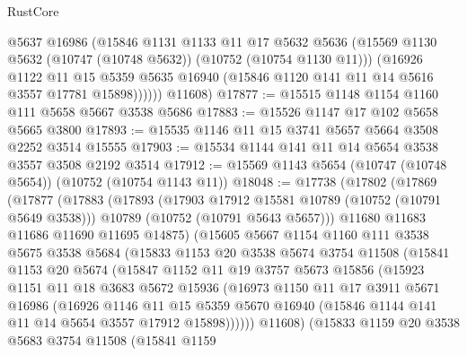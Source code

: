 \begin{lexlean}{RustCore}
\begin{coremodule}
            @5637
            @16986
            (@15846
              @1131
              @1133
              @11
              @17
              @5632
              @5636
              (@15569 @1130 @5632 (@10747 (@10748 @5632)) (@10752 (@10754 @1130 @11)))
              (@16926
                @1122
                @11
                @15
                @5359
                @5635
                @16940
                (@15846 @1120 @141 @11 @14 @5616 @3557 @17781 @15898))))))
      @11608)
@17877 := @15515 @1148 @1154 @1160 @111 @5658 @5667 @3538 @5686
@17883 := @15526 @1147 @17 @102 @5658 @5665 @3800
@17893 := @15535 @1146 @11 @15 @3741 @5657 @5664 @3508 @2252 @3514 @15555
@17903 := @15534 @1144 @141 @11 @14 @5654 @3538 @3557 @3508 @2192 @3514
@17912 := @15569 @1143 @5654 (@10747 (@10748 @5654)) (@10752 (@10754 @1143 @11))
@18048 := @17738
    (@17802
      (@17869
        (@17877
          (@17883
            (@17893
              (@17903 @17912 @15581 @10789 (@10752 (@10791 @5649 @3538)))
              @10789
              (@10752 (@10791 @5643 @5657)))
            @11680
            @11683
            @11686
            @11690
            @11695
            @14875)
          (@15605
            @5667
            @1154
            @1160
            @111
            @3538
            @5675
            @3538
            @5684
            (@15833
              @1153
              @20
              @3538
              @5674
              @3754
              @11508
              (@15841
                @1153
                @20
                @5674
                (@15847
                  @1152
                  @11
                  @19
                  @3757
                  @5673
                  @15856
                  (@15923
                    @1151
                    @11
                    @18
                    @3683
                    @5672
                    @15936
                    (@16973
                      @1150
                      @11
                      @17
                      @3911
                      @5671
                      @16986
                      (@16926
                        @1146
                        @11
                        @15
                        @5359
                        @5670
                        @16940
                        (@15846 @1144 @141 @11 @14 @5654 @3557 @17912 @15898))))))
              @11608)
            (@15833
              @1159
              @20
              @3538
              @5683
              @3754
              @11508
              (@15841
                @1159

\end{coremodule}
\end{lexlean}
